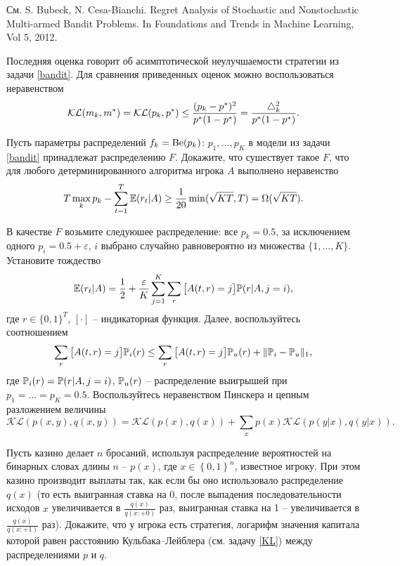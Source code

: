 \begin{ordre} См. S. Bubeck, N. Cesa-Bianchi. Regret Analysis of Stochastic and Nonstochastic Multi-armed Bandit Problems. In Foundations and Trends in Machine Learning, Vol 5, 2012. 
\end{ordre}


\begin{remark}
Последняя оценка говорит об асимптотической неулучшаемости стратегии из задачи \ref{bandit}. Для сравнения приведенных оценок можно воспользоваться неравенством
\[
\mathcal{KL}(m_k, m^{*}) = \mathcal{KL}(p_k, p^{*})  \leq \frac{(p_k - p^{*})^2}{p^{*} (1- p^{*})} =   \frac{\triangle_k^2}{p^{*} (1- p^{*})}.
\] 
\end{remark}


\begin{problem}
\label{bandit_lower}
Пусть параметры распределений $f_k = \mathrm{Be}(p_k)$:  $p_1,\ldots,p_K$ в модели из задачи \ref{bandit} принадлежат распределению $F$. Докажите, что сушествует такое $F$, что для любого детерминированного алгоритма игрока $A$ выполнено неравенство
\[
T \max \limits_k p_k - \sum_{t = 1}^{T} \mathrm{{\mathbb E}}(r_t | A) \geq \frac{1}{20} \min(\sqrt{KT}, T) = \Omega (\sqrt{KT}).
\]
\end{problem}

\begin{ordre}
В качестве $F$ возьмите следуюшее распределение: все $p_k = 0.5$, за исключением одного $p_i = 0.5 + \varepsilon$, $i$ выбрано случайно равновероятно из множества $\{1,\ldots,K\}$. Установите тождество
\[
\mathrm{{\mathbb E}}(r_t | A) = \frac{1}{2} + \frac{\varepsilon}{K} \sum_{j=1}^K \sum_{r} \big[A(t,r) = j \big] \mathrm{{\mathbb P}}(r|A, j=i),
\]
где $r \in \{0,1\}^T$, $[\cdot]$ -- индикаторная функция. Далее, воспользуйтесь 
соотношением
\[
\sum_{r} \big[A(t,r) = j \big] \mathrm{{\mathbb P}}_i(r) \leq \sum_{r} \big[A(t,r) = j \big] \mathrm{{\mathbb P}}_u(r) + \Vert \mathrm{{\mathbb P}}_i - \mathrm{{\mathbb P}}_u \Vert_1,
\]
где $\mathrm{{\mathbb P}}_i(r) = \mathrm{{\mathbb P}}(r|A, j=i)$, $\mathrm{{\mathbb P}}_u(r)$ -- распределение выигрышей при $p_1 = \ldots = p_K = 0.5$. Воспользуйтесь неравенством Пинскера и цепным разложением величины 
\[
\mathcal{KL}(p(x,y),q(x,y)) = \mathcal{KL}(p(x),q(x)) + \sum_{x} p(x) \mathcal{KL}(p(y|x),q(y|x)). 
\]

\end{ordre}


\begin{problem}
Пусть казино делает $n$ бросаний, используя распределение вероятностей на бинарных словах длины $n$ -- $p\left(x\right)$, где $x \in \left\{0,1\right\}^{n} $, известное игроку. При этом казино производит выплаты так, как если бы оно использовало распределение $q\left(x\right)$ (то есть выигранная ставка на 0, после выпадения последовательности исходов $x$ увеличивается в $\frac{q\left(x\right)}{q\left(x :+ 0\right)} $ раз, выигранная ставка на 1 -- увеличивается в $\frac{q\left(x\right)}{q\left(x :+ 1\right)} $ раз). Докажите, что у игрока есть стратегия, логарифм значения капитала которой равен расстоянию Кульбака--Лейблера (см. задачу \ref{KL})  между распределениями $p$ и $q$.
\end{problem}

